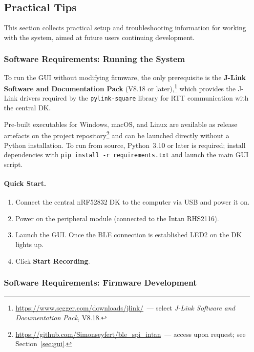 \subsection{Practical Tips}

This section collects practical setup and troubleshooting information
for working with the system, aimed at future users continuing development.

\subsubsection{Software Requirements: Running the System}
\label{app:software_run}

To run the GUI without modifying firmware, the only prerequisite is the
\textbf{J-Link Software and Documentation Pack} (V8.18 or
later),\footnote{\url{https://www.segger.com/downloads/jlink/}~--- select
\textit{J-Link Software and Documentation Pack}, V8.18.}
which provides the J-Link drivers required by the \texttt{pylink-square}
library for RTT communication with the central DK.

Pre-built executables for Windows, macOS, and Linux are available as
release artefacts on the project
repository\footnote{\url{https://github.com/Simonseyfert/ble_spi_intan}~---
access upon request; see Section~\ref{sec:gui}.}
and can be launched directly without a Python installation.
To run from source, Python~3.10 or later is required; install dependencies
with \texttt{pip install -r requirements.txt} and launch the main GUI script.

\paragraph{Quick Start.}
\begin{enumerate}
    \item Connect the central nRF52832 DK to the computer via USB and power it on.
    \item Power on the peripheral module (connected to the Intan RHS2116).
    \item Launch the GUI. Once the BLE connection is established LED2 on the
          DK lights up.
    \item Click \textbf{Start Recording}.
\end{enumerate}

\subsubsection{Software Requirements: Firmware Development}
\label{app:software_dev}

